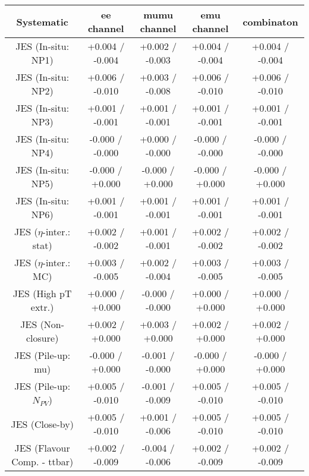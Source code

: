  \begin{table}[htbp]
 \scriptsize
   \begin{center}
   \begin{tabular}{|c|c|c|c|c|}
   \hline
 Systematic                            &  ee channel&  mumu channel&  emu channel&  combinaton\\
   \hline
 JES (In-situ: NP1)                    &+0.004   / -0.004   & +0.002   / -0.003   & +0.004   / -0.004   & +0.004   / -0.004  \\
 JES (In-situ: NP2)                    &+0.006   / -0.010   & +0.003   / -0.008   & +0.006   / -0.010   & +0.006   / -0.010  \\
 JES (In-situ: NP3)                    &+0.001   / -0.001   & +0.001   / -0.001   & +0.001   / -0.001   & +0.001   / -0.001  \\
 JES (In-situ: NP4)                    &-0.000   / -0.000   & +0.000   / -0.000   & -0.000   / -0.000   & -0.000   / -0.000  \\
 JES (In-situ: NP5)                    &-0.000   / +0.000   & -0.000   / +0.000   & -0.000   / +0.000   & -0.000   / +0.000  \\
 JES (In-situ: NP6)                    &+0.001   / -0.001   & +0.001   / -0.001   & +0.001   / -0.001   & +0.001   / -0.001  \\
 JES ($\eta$-inter.: stat)             &+0.002   / -0.002   & +0.001   / -0.001   & +0.002   / -0.002   & +0.002   / -0.002  \\
 JES ($\eta$-inter.: MC)               &+0.003   / -0.005   & +0.002   / -0.004   & +0.003   / -0.005   & +0.003   / -0.005  \\
 JES (High pT extr.)                   &+0.000   / +0.000   & -0.000   / -0.000   & +0.000   / +0.000   & +0.000   / +0.000  \\
 JES (Non-closure)                     &+0.002   / +0.000   & +0.003   / +0.000   & +0.002   / +0.000   & +0.002   / +0.000  \\
 JES (Pile-up: mu)                     &-0.000   / +0.000   & -0.001   / -0.000   & -0.000   / +0.000   & -0.000   / +0.000  \\
 JES (Pile-up: $N_{PV}$)               &+0.005   / -0.010   & -0.001   / -0.009   & +0.005   / -0.010   & +0.005   / -0.010  \\
 JES (Close-by)                        &+0.005   / -0.010   & +0.001   / -0.006   & +0.005   / -0.010   & +0.005   / -0.010  \\
 JES (Flavour Comp. - ttbar)           &+0.002   / -0.009   & -0.004   / -0.006   & +0.002   / -0.009   & +0.002   / -0.009  \\

\end{tabular}
\end{center}
\end{table}
